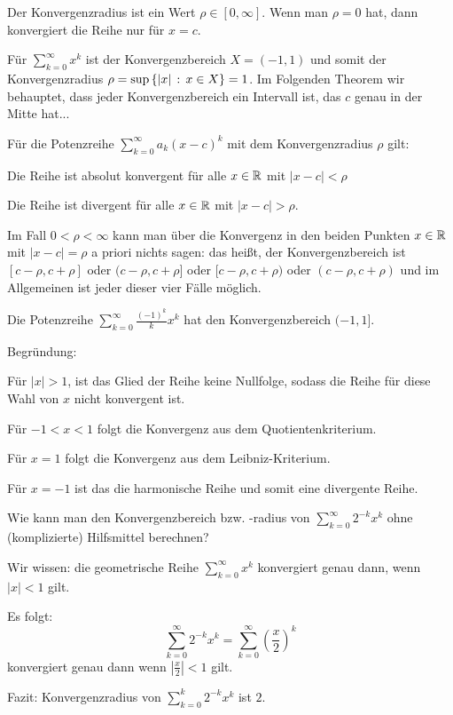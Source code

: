 \begin{bem}
	Der Konvergenzradius ist ein Wert $\rho \in [0,\infty]$. Wenn man $\rho=0$ hat, dann konvergiert die Reihe nur für $x=c$. 
\end{bem} 

\begin{bsp}
	Für $\sum_{k=0}^\infty x^k$ ist der Konvergenzbereich $X = (-1,1)$ und somit der Konvergenzradius $\rho = \sup \left\{ |x| \,:\, x \in X \right\} = 1$.  Im Folgenden Theorem wir behauptet, dass jeder Konvergenzbereich ein Intervall ist, das $c$ genau in der Mitte hat...
\end{bsp} 

\begin{thm}
	Für die Potenzreihe $\sum_{k=0}^\infty a_k (x-c)^k$ mit dem Konvergenzradius $\rho$ gilt: 
	\begin{enuma}
		\item Die Reihe ist absolut konvergent für alle $x \in \mathbb{R}$ mit $|x-c| < \rho$
		\item Die Reihe ist divergent für alle $x \in \mathbb{R}$ mit $|x-c| > \rho$.
		\item Im Fall $0 < \rho < \infty$ kann man über die Konvergenz in den beiden Punkten $x \in \mathbb{R}$ mit $|x-c| = \rho$ a priori nichts sagen: das heißt, der Konvergenzbereich ist $[c-\rho,c+\rho]$ oder $(c-\rho,c+\rho]$ oder $[c-\rho,c+\rho)$ oder $(c-\rho,c+\rho)$ und im Allgemeinen ist jeder dieser vier Fälle möglich. 
	\end{enuma}
\end{thm} 

\begin{bsp} 
	Die Potenzreihe $\sum_{k=0}^\infty \frac{(-1)^k}{k} x^k$ hat den Konvergenzbereich $(-1,1]$.  
	
	Begründung: 
	\begin{enuma}
		\item Für $|x| > 1$, ist das Glied der Reihe keine Nullfolge, sodass die Reihe für diese Wahl von $x$ nicht konvergent ist. 
		\item Für $-1 < x < 1$ folgt die Konvergenz aus dem Quotientenkriterium. 
		\item Für $x=1$ folgt die Konvergenz aus dem Leibniz-Kriterium. 
		\item Für $x=-1$ ist das die harmonische Reihe und somit eine divergente Reihe. 
	\end{enuma} 
\end{bsp} 

\begin{bsp} 
	Wie kann man den Konvergenzbereich bzw. -radius von $\sum_{k=0}^\infty 2^{-k} x^k$ ohne (komplizierte) Hilfsmittel berechnen? 
	
	
	Wir wissen: die geometrische Reihe $\sum_{k=0}^\infty x^k$ konvergiert genau dann, wenn $|x| < 1$ gilt. 
	
	Es folgt: 
	\[
		\sum_{k=0}^\infty 2^{-k} x^k = \sum_{k=0}^\infty \left( \frac{x}{2}\right)^k
	\]
	konvergiert genau dann wenn $\left| \frac{x}{2} \right|  < 1$ gilt. 

	Fazit: Konvergenzradius von $\sum_{k=0}^k 2^{-k} x^k$ ist $2$. 
\end{bsp} 

